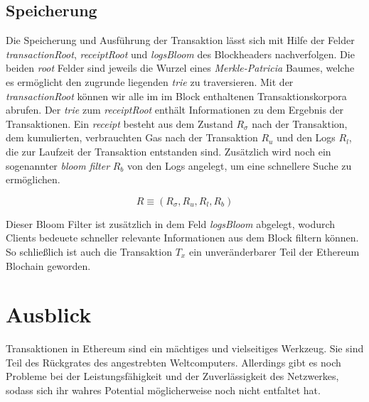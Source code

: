 \documentclass[runningheads]{llncs}
\begin{document}
\subsection{Speicherung}
Die Speicherung und Ausführung der Transaktion lässt sich mit Hilfe der Felder \textit{transactionRoot}, \textit{receiptRoot} und \textit{logsBloom} des Blockheaders nachverfolgen. Die beiden \textit{root} Felder sind jeweils die Wurzel eines \textit{Merkle-Patricia} Baumes, welche es ermöglicht den zugrunde liegenden \textit{trie} zu traversieren. \cite{noauthor_ethereum/patricia_nodate} Mit der \textit{transactionRoot} können wir alle  im im Block enthaltenen Transaktionskorpora abrufen. Der \textit{trie} zum \textit{receiptRoot} enthält Informationen zu dem Ergebnis der Transaktionen. Ein \textit{receipt} besteht aus dem Zustand $ R_{\sigma} $ nach der Transaktion, dem kumulierten, verbrauchten Gas nach der Transaktion $ R_u $ und den Logs $ R_l $, die zur Laufzeit der Transaktion entstanden sind. Zusätzlich wird noch ein sogenannter \textit{bloom filter} $ R_b $ von den Logs angelegt, um eine schnellere Suche zu ermöglichen. \cite{noauthor_logs_nodate}

$$
R \equiv (R_{\sigma}, R_u, R_l, R_b)
$$

Dieser Bloom Filter ist zusätzlich in dem Feld \textit{logsBloom} abgelegt, wodurch Clients bedeuete schneller relevante Informationen aus dem Block filtern können. \cite[S. 5]{wood_ethereum_nodate} So schließlich ist auch die Transaktion $ T_x $ ein unveränderbarer Teil der Ethereum Blochain geworden.

\section{Ausblick}
Transaktionen in Ethereum sind ein mächtiges und vielseitiges Werkzeug. Sie sind Teil des Rückgrates des angestrebten Weltcomputers. Allerdings gibt es noch Probleme bei der Leistungsfähigkeit und der Zuverlässigkeit des Netzwerkes, sodass sich ihr wahres Potential möglicherweise noch nicht entfaltet hat.




\end{document}
